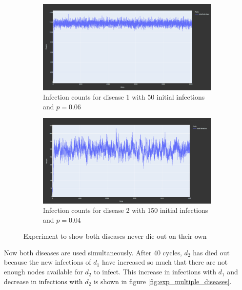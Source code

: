 \begin{figure}
    \centering
    \begin{subfigure}[b]{0.475\textwidth}
        \centering
        \includegraphics[width=\textwidth]{images/exp_multiple_diseases_d1.png}
        \caption[Network2]%
        {{\small Infection counts for disease 1 with 50 initial infections and $p = 0.06$}}   
    \end{subfigure}
    \hfill
    \begin{subfigure}[b]{0.475\textwidth}  
        \centering 
        \includegraphics[width=\textwidth]{images/exp_multiple_diseases_d2.png}
        \caption[]%
        {{\small Infection counts for disease 2 with 150 initial infections and $p = 0.04$}}    
    \end{subfigure}
    \caption[Experiment to show both diseases never die out on their own]
    {\small Experiment to show both diseases never die out on their own} 
    \label{fig:exp_multiple_diseases_individual}
\end{figure}

Now both diseases are used simultaneously. After 40 cycles, $d_2$ has died out because the new infections of $d_1$ have increased so much that there are not enough nodes available for $d_2$ to infect. This increase in infections with $d_1$ and decrease in infections with $d_2$ is shown in figure \ref{fig:exp_multiple_diseases}.

